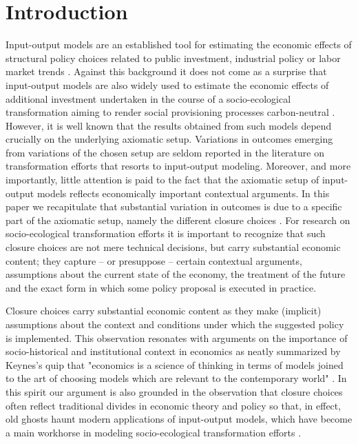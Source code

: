 \section{Introduction}\label{sec:intro}

Input-output models are an established tool for estimating the economic effects of structural policy choices related to public investment, industrial policy or labor market trends \citep{BlairMiller}. Against this background it does not come as a surprise that input-output models are also widely used to estimate the economic effects of additional investment undertaken in the course of a socio-ecological transformation aiming to render social provisioning processes carbon-neutral \citep{Leontief.1970, Hornykewycz.2025, Markandya.2016, Markaki.2013}. However, it is well known that the results obtained from such models depend crucially on the underlying axiomatic setup. Variations in outcomes emerging from variations of the chosen setup are seldom reported in the literature on transformation efforts that resorts to input-output modeling. Moreover, and more importantly, little attention is paid to the fact that the axiomatic setup of input-output models reflects economically important contextual arguments. In this paper we recapitulate that substantial variation in outcomes is due to a specific part of the axiomatic setup, namely the different closure choices \citep{Robinson.2006, Rose.1995}. For research on socio-ecological transformation efforts it is important to recognize that such closure choices are not mere technical decisions, but carry substantial economic content; they capture -- or presuppose -- certain contextual arguments, assumptions about the current state of the economy, the treatment of the future and the exact form in which some policy proposal is executed in practice.

Closure choices carry substantial economic content as they make (implicit) assumptions about the context and conditions under which the suggested policy is implemented. This observation resonates with arguments on the importance of socio-historical and institutional context in economics \citep{Polanyi.2001, Hodsgon.2010, Dobusch.2012} as neatly summarized by Keynes's quip that "economics is a science of thinking in terms of models joined to the art of choosing models which are relevant to the contemporary world" \citep{Keynes.1938}. In this spirit our argument is also grounded in the observation that closure choices often reflect traditional divides in economic theory and policy so that, in effect, old ghosts haunt modern applications of input-output models, which have become a main workhorse in modeling socio-ecological transformation efforts \citep{Garrett.2017, Hornykewycz.2025, Markandya.2016, Markaki.2013}. 

